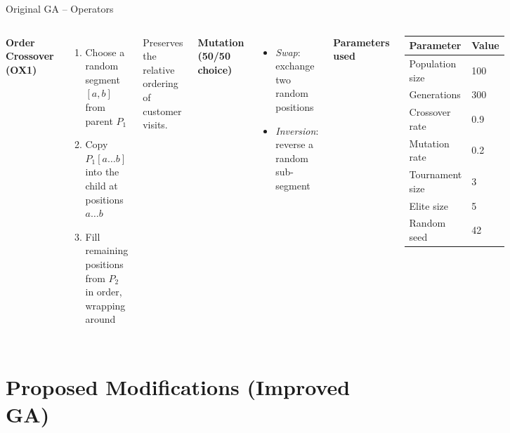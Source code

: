 \documentclass{beamer}
\begin{document}
\begin{frame}{Original GA -- Operators}
  \begin{columns}
    \textbf{Order Crossover (OX1)} \cite{davis1985applying}
    \begin{enumerate}
      \item Choose a random segment $[a, b]$ from parent $P_1$
      \item Copy $P_1[a\ldots b]$ into the child at positions $a\ldots b$
      \item Fill remaining positions from $P_2$ in order, wrapping around
    \end{enumerate}
    Preserves the relative ordering of customer visits.

    \vspace{8pt}
    \textbf{Mutation (50/50 choice)}
    \begin{itemize}
      \item \emph{Swap}: exchange two random positions
      \item \emph{Inversion}: reverse a random sub-segment
    \end{itemize}

    \textbf{Parameters used}
    \begin{center}
    \begin{tabular}{ll}
      \toprule
      Parameter & Value \\
      \midrule
      Population size     & 100  \\
      Generations         & 300  \\
      Crossover rate      & 0.9  \\
      Mutation rate       & 0.2  \\
      Tournament size     & 3    \\
      Elite size          & 5    \\
      Random seed         & 42   \\
      \bottomrule
    \end{tabular}
    \end{center}
  \end{columns}
\end{frame}

\section{Proposed Modifications (Improved GA)}
\end{document}
